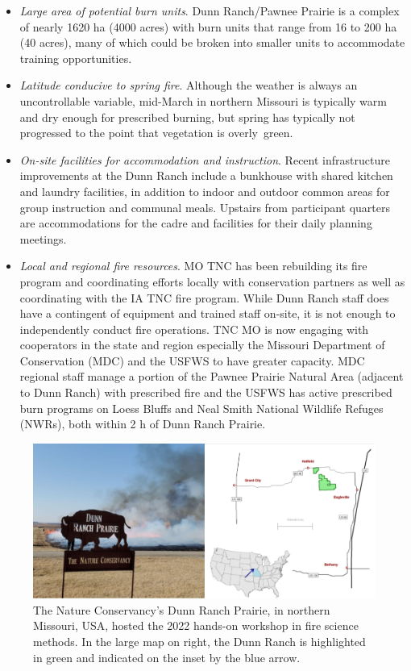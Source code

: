 \documentclass[fire,casereport,accept,moreauthors,pdftex]{Definitions/mdpi}  %
\begin{document}
\begin{itemize}
\item
  \emph{Large area of potential burn units}. Dunn Ranch/Pawnee Prairie is a complex of nearly 1620 ha (4000 acres) with burn units that range from 16 to 200 ha (40 acres), many of which could be broken into smaller units to accommodate training opportunities.
\item
  \emph{Latitude conducive to spring fire}.
  Although the weather is always an uncontrollable variable, mid-March in northern Missouri is typically warm and dry enough for prescribed burning, but spring has typically not progressed to the point that vegetation is overly~green.
\item
  \emph{On-site facilities for accommodation and instruction}.
  Recent infrastructure improvements at the Dunn Ranch include a bunkhouse with shared kitchen and laundry facilities, in addition to indoor and outdoor common areas for group instruction and communal meals.
  Upstairs from participant quarters are accommodations for the cadre and facilities for their daily planning meetings.
\item
  \emph{Local and regional fire resources}.
  MO TNC has been rebuilding its fire program and coordinating efforts locally with conservation partners as well as coordinating with the IA TNC fire program. 
  While Dunn Ranch staff does have a contingent of equipment and trained staff on-site, it is not enough to independently conduct fire operations.
  TNC MO is now engaging with cooperators in the state and region especially the Missouri Department of Conservation (MDC) and the USFWS to have greater capacity.
  MDC regional staff manage a portion of the Pawnee Prairie Natural Area (adjacent to Dunn Ranch) with prescribed fire and the USFWS has active prescribed burn programs on Loess Bluffs and Neal Smith National Wildlife Refuges (NWRs), both within 2 h of Dunn Ranch Prairie. 
  
\end{itemize}

\begin{figure}[H]
\includegraphics[width=1\columnwidth]{DunnRanchMap.png}
\caption{The Nature Conservancy's Dunn Ranch Prairie, in northern Missouri, USA, hosted the 2022 hands-on workshop in fire science methods. In the large map on right, the Dunn Ranch is highlighted in green and indicated on the inset by the blue arrow.}
\label{DunnRanch}
\end{figure}
\end{document}
